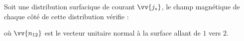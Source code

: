\documentclass[a4paper]{article}
\begin{document}
\pagestyle{fancy}
\fancyhf{}
\setlength{\headheight}{15pt}

\begin{center}
	\large{}
\end{center}


Soit une distribution surfacique de courant \(\vv{j_s}\), le champ magnétique de chaque côté de cette distribution vérifie :\begin{center}\end{center}où \(\vv{n_{12}}\) est le vecteur unitaire normal à la surface allant de \(1\) vers \(2\).
\end{document}
